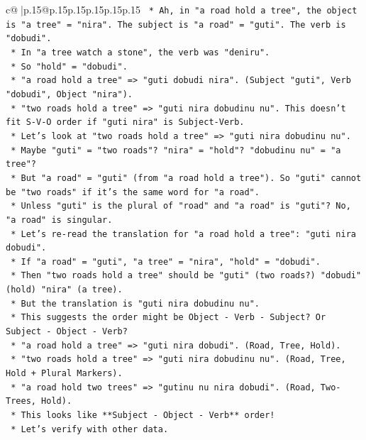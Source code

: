 \documentclass{article}
\begin{document}
{\begin{supertabular}{c@{$\;$}|p{.15\linewidth}@{}p{.15\linewidth}p{.15\linewidth}p{.15\linewidth}p{.15\linewidth}p{.15\linewidth}}
{{{\texttt{        *   Ah, in "a road hold a tree", the object is "a tree" = "nira". The subject is "a road" = "guti". The verb is "dobudi".} \\
\texttt{        *   In "a tree watch a stone", the verb was "deniru".} \\
\texttt{        *   So "hold" = "dobudi".} \\
\texttt{        *   "a road hold a tree" => "guti dobudi nira". (Subject "guti", Verb "dobudi", Object "nira").} \\
\texttt{        *   "two roads hold a tree" => "guti nira dobudinu nu". This doesn't fit S{-}V{-}O order if "guti nira" is Subject{-}Verb.} \\
\texttt{        *   Let's look at "two roads hold a tree" => "guti nira dobudinu nu".} \\
\texttt{        *   Maybe "guti" = "two roads"? "nira" = "hold"? "dobudinu nu" = "a tree"?} \\
\texttt{        *   But "a road" = "guti" (from "a road hold a tree"). So "guti" cannot be "two roads" if it's the same word for "a road".} \\
\texttt{        *   Unless "guti" is the plural of "road" and "a road" is "guti"? No, "a road" is singular.} \\
\texttt{        *   Let's re{-}read the translation for "a road hold a tree": "guti nira dobudi".} \\
\texttt{        *   If "a road" = "guti", "a tree" = "nira", "hold" = "dobudi".} \\
\texttt{        *   Then "two roads hold a tree" should be "guti" (two roads?) "dobudi" (hold) "nira" (a tree).} \\
\texttt{        *   But the translation is "guti nira dobudinu nu".} \\
\texttt{        *   This suggests the order might be Object {-} Verb {-} Subject? Or Subject {-} Object {-} Verb?} \\
\texttt{        *   "a road hold a tree" => "guti nira dobudi". (Road, Tree, Hold).} \\
\texttt{        *   "two roads hold a tree" => "guti nira dobudinu nu". (Road, Tree, Hold + Plural Markers).} \\
\texttt{        *   "a road hold two trees" => "gutinu nu nira dobudi". (Road, Two{-}Trees, Hold).} \\
\texttt{        *   This looks like **Subject {-} Object {-} Verb** order!} \\
\texttt{        *   Let's verify with other data.} \\
}}}
\end{supertabular}}
\end{document}
